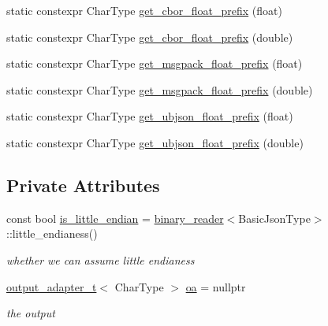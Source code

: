 \begin{DoxyCompactItemize}
static constexpr Char\+Type \hyperlink{classnlohmann_1_1detail_1_1binary__writer_a2b5cb010077da6241a18bb334736464c}{get\+\_\+cbor\+\_\+float\+\_\+prefix} (float)
\item 
static constexpr Char\+Type \hyperlink{classnlohmann_1_1detail_1_1binary__writer_afe5ac43e05973ba09ee79227bb589b59}{get\+\_\+cbor\+\_\+float\+\_\+prefix} (double)
\item 
static constexpr Char\+Type \hyperlink{classnlohmann_1_1detail_1_1binary__writer_ad452d114696407b98abc69b6001c270e}{get\+\_\+msgpack\+\_\+float\+\_\+prefix} (float)
\item 
static constexpr Char\+Type \hyperlink{classnlohmann_1_1detail_1_1binary__writer_a47234a6e7ac9206d43553985f4cacbf2}{get\+\_\+msgpack\+\_\+float\+\_\+prefix} (double)
\item 
static constexpr Char\+Type \hyperlink{classnlohmann_1_1detail_1_1binary__writer_a6837b20574152f7f645d0f6cd9fafdeb}{get\+\_\+ubjson\+\_\+float\+\_\+prefix} (float)
\item 
static constexpr Char\+Type \hyperlink{classnlohmann_1_1detail_1_1binary__writer_a19eb47a53dbbe28f319532bef25d84e6}{get\+\_\+ubjson\+\_\+float\+\_\+prefix} (double)
\end{DoxyCompactItemize}
\subsection*{Private Attributes}
\begin{DoxyCompactItemize}
\item 
const bool \hyperlink{classnlohmann_1_1detail_1_1binary__writer_a048887c907afe39759b777e8c888414c}{is\+\_\+little\+\_\+endian} = \hyperlink{classnlohmann_1_1detail_1_1binary__reader}{binary\+\_\+reader}$<$Basic\+Json\+Type$>$\+::little\+\_\+endianess()
\begin{DoxyCompactList}\small\item\em whether we can assume little endianess \end{DoxyCompactList}\item 
\hyperlink{namespacenlohmann_1_1detail_a0fd8edff7729aa2dd92b070964bade2e}{output\+\_\+adapter\+\_\+t}$<$ Char\+Type $>$ \hyperlink{classnlohmann_1_1detail_1_1binary__writer_a6f15b782a7900f50ef37d123008e601b}{oa} = nullptr
\begin{DoxyCompactList}\small\item\em the output \end{DoxyCompactList}\end{DoxyCompactItemize}


